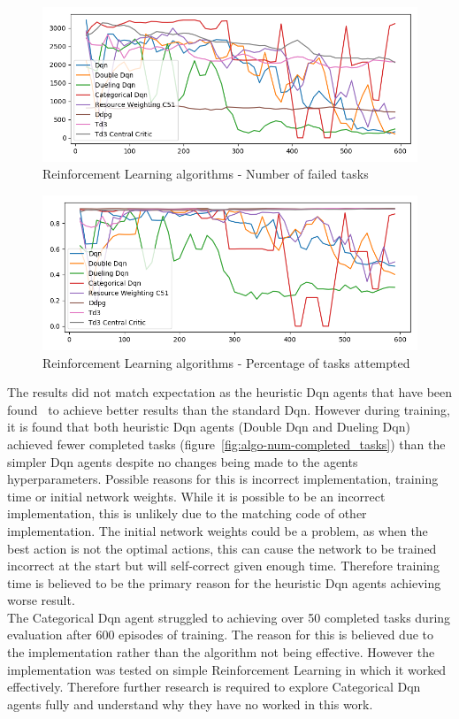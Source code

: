\begin{figure}[H]
    \centering
    \includegraphics[width=\linewidth]{figures/5_evaluation_figs/algo_training_fig/num_failed_tasks.png}
    \caption{Reinforcement Learning algorithms - Number of failed tasks}
    \label{fig:algo-num-failed-tasks}
\end{figure}

\begin{figure}[H]
    \centering
    \includegraphics[width=\linewidth]{figures/5_evaluation_figs/algo_training_fig/percent_tasks.png}
    \caption{Reinforcement Learning algorithms - Percentage of tasks attempted}
    \label{fig:algo-percent-tasks}
\end{figure}

The results did not match expectation as the heuristic Dqn agents that have been
found~\citep{doubledqn, duelingdqn, rainbow} to achieve better results than the standard Dqn. However during training,
it is found that both heuristic Dqn agents (Double Dqn and Dueling Dqn) achieved fewer completed tasks
(figure~\ref{fig:algo-num-completed_tasks}) than the simpler Dqn agents despite no changes
being made to the agents hyperparameters. Possible reasons for this is incorrect implementation,
training time or initial network weights. While it is possible to be an incorrect implementation, this is unlikely
due to the matching code of other implementation. The initial network weights could be a problem,
as when the best action is not the optimal actions, this can cause the network to be trained incorrect at the start but
will self-correct given enough time. Therefore training time is believed to be the primary reason for the heuristic Dqn
agents achieving worse result. \\
The Categorical Dqn agent struggled to achieving over 50 completed tasks during evaluation after 600 episodes of
training. The reason for this is believed due to the implementation rather than the algorithm not being effective.
However the implementation was tested on simple Reinforcement Learning in which it worked effectively. Therefore
further research is required to explore Categorical Dqn agents fully and understand why they have no worked in this
work.

